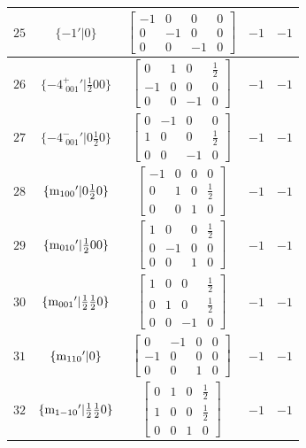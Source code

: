 \documentclass[fleqn,8pt]{jsarticle}
\begin{document}
\begin{longtable}{ccccc}
$ 25 $ & $ \{-1{}'|0\} $ & $ \begin{bmatrix} -1 & 0 & 0 & 0 \\ 0 & -1 & 0 & 0 \\ 0 & 0 & -1 & 0 \end{bmatrix} $ & $ -1 $ & $ -1 $ \\ \hline
$ 26 $ & $ \{-4^{+}_{\,\,001}{}'|\frac{1}{2} 0 0\} $ & $ \begin{bmatrix} 0 & 1 & 0 & \frac{1}{2} \\ -1 & 0 & 0 & 0 \\ 0 & 0 & -1 & 0 \end{bmatrix} $ & $ -1 $ & $ -1 $ \\ \hline
$ 27 $ & $ \{-4^{-}_{\,\,001}{}'|0 \frac{1}{2} 0\} $ & $ \begin{bmatrix} 0 & -1 & 0 & 0 \\ 1 & 0 & 0 & \frac{1}{2} \\ 0 & 0 & -1 & 0 \end{bmatrix} $ & $ -1 $ & $ -1 $ \\ \hline
$ 28 $ & $ \{{\rm m}_{100}{}'|0 \frac{1}{2} 0\} $ & $ \begin{bmatrix} -1 & 0 & 0 & 0 \\ 0 & 1 & 0 & \frac{1}{2} \\ 0 & 0 & 1 & 0 \end{bmatrix} $ & $ -1 $ & $ -1 $ \\ \hline
$ 29 $ & $ \{{\rm m}_{010}{}'|\frac{1}{2} 0 0\} $ & $ \begin{bmatrix} 1 & 0 & 0 & \frac{1}{2} \\ 0 & -1 & 0 & 0 \\ 0 & 0 & 1 & 0 \end{bmatrix} $ & $ -1 $ & $ -1 $ \\ \hline
$ 30 $ & $ \{{\rm m}_{001}{}'|\frac{1}{2} \frac{1}{2} 0\} $ & $ \begin{bmatrix} 1 & 0 & 0 & \frac{1}{2} \\ 0 & 1 & 0 & \frac{1}{2} \\ 0 & 0 & -1 & 0 \end{bmatrix} $ & $ -1 $ & $ -1 $ \\ \hline
$ 31 $ & $ \{{\rm m}_{110}{}'|0\} $ & $ \begin{bmatrix} 0 & -1 & 0 & 0 \\ -1 & 0 & 0 & 0 \\ 0 & 0 & 1 & 0 \end{bmatrix} $ & $ -1 $ & $ -1 $ \\ \hline
$ 32 $ & $ \{{\rm m}_{1-10}{}'|\frac{1}{2} \frac{1}{2} 0\} $ & $ \begin{bmatrix} 0 & 1 & 0 & \frac{1}{2} \\ 1 & 0 & 0 & \frac{1}{2} \\ 0 & 0 & 1 & 0 \end{bmatrix} $ & $ -1 $ & $ -1 $ \\
\end{longtable}
\end{document}
